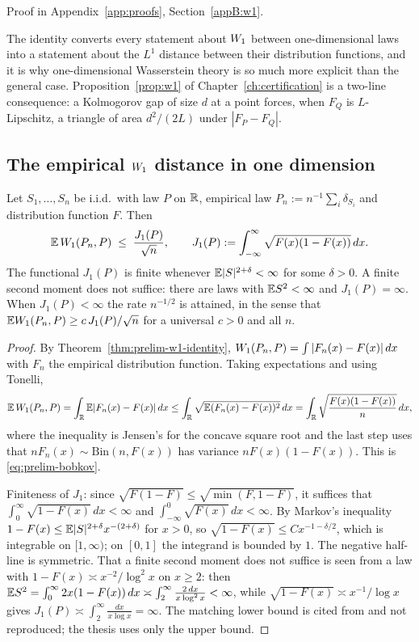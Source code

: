 \documentclass[../../../main.tex]{subfiles}
\begin{document}
Proof in Appendix~\ref{app:proofs}, Section~\ref{appB:w1}.

The identity converts every statement about $W_1$ between one-dimensional laws into a statement about the $L^1$ distance between their distribution functions, and it is why one-dimensional Wasserstein theory is so much more explicit than the general case. Proposition~\ref{prop:w1} of Chapter~\ref{ch:certification} is a two-line consequence: a Kolmogorov gap of size $d$ at a point forces, when $F_Q$ is $L$-Lipschitz, a triangle of area $d^2/(2L)$ under $|F_P-F_Q|$.

\subsection{The empirical $W_1$ distance in one dimension}

\begin{theorem}\label{thm:prelim-bobkov}
Let $S_1,\dots,S_n$ be i.i.d.\ with law $P$ on $\mathbb{R}$, empirical law $P_n:=n^{-1}\sum_i\delta_{S_i}$ and distribution function $F$. Then
\begin{equation}\label{eq:prelim-bobkov}
\mathbb{E}\,W_1(P_n,P)\;\le\;\frac{J_1(P)}{\sqrt n},\qquad J_1(P):=\int_{-\infty}^{\infty}\sqrt{F(x)(1-F(x))}\,dx .
\end{equation}
The functional $J_1(P)$ is finite whenever $\mathbb{E}|S|^{2+\delta}<\infty$ for some $\delta>0$. A finite second moment does not suffice: there are laws with $\mathbb{E} S^2<\infty$ and $J_1(P)=\infty$. When $J_1(P)<\infty$ the rate $n^{-1/2}$ is attained, in the sense that $\mathbb{E}W_1(P_n,P)\ge c\,J_1(P)/\sqrt n$ for a universal $c>0$ and all $n$.
\end{theorem}

\begin{proof}
By Theorem~\ref{thm:prelim-w1-identity}, $W_1(P_n,P)=\int|F_n(x)-F(x)|\,dx$ with $F_n$ the empirical distribution function. Taking expectations and using Tonelli,
\[
\mathbb{E}\,W_1(P_n,P)=\int_{\mathbb{R}}\mathbb{E}|F_n(x)-F(x)|\,dx\le\int_{\mathbb{R}}\sqrt{\mathbb{E}(F_n(x)-F(x))^2}\,dx=\int_{\mathbb{R}}\sqrt{\frac{F(x)(1-F(x))}{n}}\,dx,
\]
where the inequality is Jensen's for the concave square root and the last step uses that $nF_n(x)\sim\mathrm{Bin}(n,F(x))$ has variance $nF(x)(1-F(x))$. This is \eqref{eq:prelim-bobkov}.

Finiteness of $J_1$: since $\sqrt{F(1-F)}\le\sqrt{\min(F,1-F)}$, it suffices that $\int_0^\infty\sqrt{1-F(x)}\,dx<\infty$ and $\int_{-\infty}^0\sqrt{F(x)}\,dx<\infty$. By Markov's inequality $1-F(x)\le\mathbb{E}|S|^{2+\delta}x^{-(2+\delta)}$ for $x>0$, so $\sqrt{1-F(x)}\le Cx^{-1-\delta/2}$, which is integrable on $[1,\infty)$; on $[0,1]$ the integrand is bounded by $1$. The negative half-line is symmetric. That a finite second moment does not suffice is seen from a law with $1-F(x)\asymp x^{-2}/\log^2x$ on $x\ge2$: then $\mathbb{E} S^2=\int_0^\infty2x(1-F(x))\,dx\asymp\int_2^\infty\frac{2\,dx}{x\log^2x}<\infty$, while $\sqrt{1-F(x)}\asymp x^{-1}/\log x$ gives $J_1(P)\asymp\int_2^\infty\frac{dx}{x\log x}=\infty$. The matching lower bound is cited from \cite{bobkov2019} and not reproduced; the thesis uses only the upper bound.
\end{proof}
\end{document}

